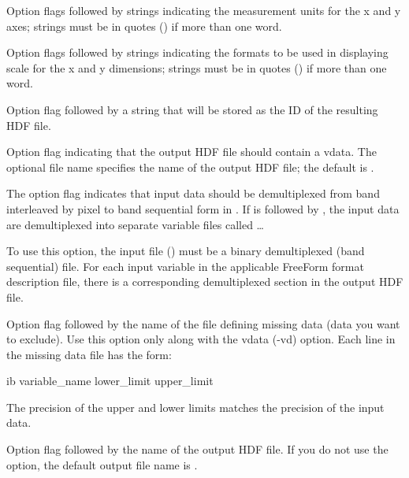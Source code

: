 \begin{description}
  Option flags followed by strings indicating the measurement units
  for the x and y axes; strings must be in quotes () if more than
  one word.

\item[\hdfxfyf]
  
  Option flags followed by strings indicating the formats to be used
  in displaying scale for the x and y dimensions; strings must be in
  quotes () if more than one word.

\item[\hdfid]
  
  Option flag followed by a string that will be stored as the ID of
  the resulting HDF file.

\item[\hdfvd]
  
  Option flag indicating that the output HDF file should contain a
  vdata. The optional file name specifies the name of the output HDF
  file; the default is .

\item[\hdfdmx]
  
  The option flag  indicates that input data should be
  demultiplexed from band interleaved by pixel to band sequential form
  in . If  is followed by ,
  the input data are demultiplexed into separate variable files called
   \ldots {}

\item[\hdfdf]
  
  To use this option, the input file () must be a
  binary demultiplexed (band sequential) file.  For each input
  variable in the applicable FreeForm format description file, there
  is a corresponding demultiplexed section in the output HDF file.

\item[\hdfmd]
  
  Option flag followed by the name of the file defining missing data
  (data you want to exclude). Use this option only along with the
  vdata (-vd) option. Each line in the missing data file has the form:

\begin{vcode}{ib}
variable_name lower_limit upper_limit 
\end{vcode}

The precision of the upper and lower limits matches the precision of
the input data.

\item[\hdfdof]
  
  Option flag followed by the name of the output HDF file. If you do
  not use the  option, the default output file name is
  .
\end{description}

